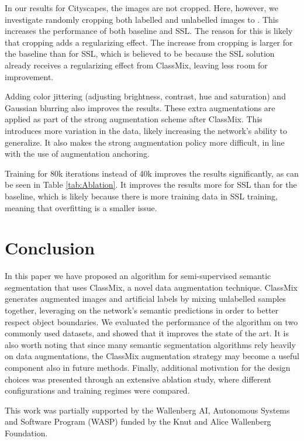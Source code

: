 \documentclass[10pt,twocolumn,letterpaper]{article}
\begin{document}
In our results for Cityscapes, the images are not cropped. Here, however, we investigate randomly cropping both labelled and unlabelled images to . This increases the performance of both baseline and SSL. The reason for this is likely that cropping adds a regularizing effect. The increase from cropping is larger for the baseline than for SSL, which is believed to be because the SSL solution already receives a regularizing effect from ClassMix, leaving less room for improvement.

Adding color jittering (adjusting brightness, contrast, hue and saturation) and Gaussian blurring also improves the results. These extra augmentations are applied as part of the strong augmentation scheme after ClassMix. This introduces more variation in the data, likely increasing the network's ability to generalize. It also makes the strong augmentation policy more difficult, in line with the use of augmentation anchoring.

Training for 80k iterations instead of 40k improves the results significantly, as can be seen in Table \ref{tab:Ablation}. It improves the results more for SSL than for the baseline, which is likely because there is more training data in SSL training, meaning that overfitting is a smaller issue.



\section{Conclusion}

In this paper we have proposed an algorithm for semi-supervised semantic segmentation that uses ClassMix, a novel data augmentation technique. ClassMix generates augmented images and artificial labels by mixing unlabelled samples together, leveraging on the network's semantic predictions in order to better respect object boundaries. We evaluated the performance of the algorithm on two commonly used datasets, and showed that it improves the state of the art. It is also worth noting that since many semantic segmentation algorithms rely heavily on data augmentations, the ClassMix augmentation strategy may become a useful component also in future methods. Finally, additional motivation for the design choices was presented through an extensive ablation study, where different configurations and training regimes were compared.

\vspace{0.4cm}
 This work was partially supported by the Wallenberg AI, Autonomous Systems and Software Program (WASP) funded by the Knut and Alice Wallenberg Foundation.


{\small


}
\end{document}
